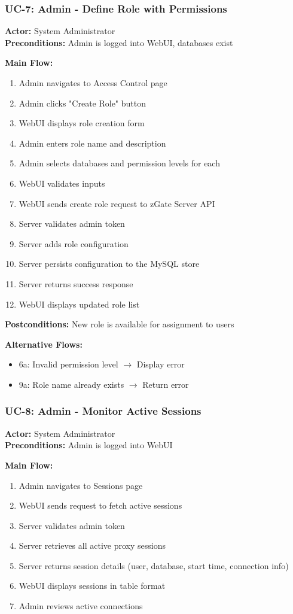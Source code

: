 \subsubsection{UC-7: Admin - Define Role with Permissions}
\textbf{Actor:} System Administrator \\
\textbf{Preconditions:} Admin is logged into WebUI, databases exist

\textbf{Main Flow:}
\begin{enumerate}
    \item Admin navigates to Access Control page
    \item Admin clicks "Create Role" button
    \item WebUI displays role creation form
    \item Admin enters role name and description
    \item Admin selects databases and permission levels for each
    \item WebUI validates inputs
    \item WebUI sends create role request to zGate Server API
    \item Server validates admin token
    \item Server adds role configuration
    \item Server persists configuration to the MySQL store
    \item Server returns success response
    \item WebUI displays updated role list
\end{enumerate}

\textbf{Postconditions:} New role is available for assignment to users

\textbf{Alternative Flows:}
\begin{itemize}
    \item 6a: Invalid permission level $\rightarrow$ Display error
    \item 9a: Role name already exists $\rightarrow$ Return error
\end{itemize}

\subsubsection{UC-8: Admin - Monitor Active Sessions}
\textbf{Actor:} System Administrator \\
\textbf{Preconditions:} Admin is logged into WebUI

\textbf{Main Flow:}
\begin{enumerate}
    \item Admin navigates to Sessions page
    \item WebUI sends request to fetch active sessions
    \item Server validates admin token
    \item Server retrieves all active proxy sessions
    \item Server returns session details (user, database, start time, connection info)
    \item WebUI displays sessions in table format
    \item Admin reviews active connections
\end{enumerate}

